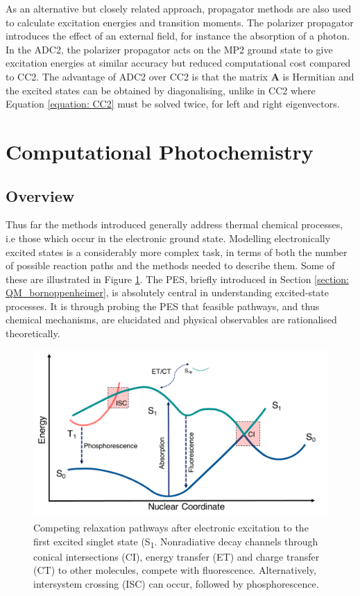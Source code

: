 As an alternative but closely related approach, propagator methods are also used to calculate excitation energies and transition moments. The polarizer propagator introduces the effect of an external field, for instance the absorption of a photon. In the \ac{ADC2}, the polarizer propagator acts on the \ac{MP2} ground state to give excitation energies at similar accuracy but reduced computational cost compared to \ac{CC}2.\cite{Trofimov1995,Trofimov1997} The advantage of \ac{ADC2} over CC2 is that the matrix $\bm{A}$ is Hermitian and the excited states can be obtained by diagonalising, unlike in CC2 where Equation \ref{equation: CC2} must be solved twice, for left and right eigenvectors.

\section{Computational Photochemistry}\label{section: Photo}
\subsection{Overview}\label{section: photo_overview}
Thus far the methods introduced generally address thermal chemical processes, i.e those which occur in the electronic ground state. Modelling electronically excited states is a considerably more complex task, in terms of both the number of possible reaction paths and the methods needed to describe them. Some of these are illustrated in Figure \ref{figure: Jablonski}. The \acf{PES}, briefly introduced in Section \ref{section: QM_bornoppenheimer}, is absolutely central in understanding excited-state processes. It is through probing the \ac{PES} that feasible pathways, and thus chemical mechanisms, are elucidated and physical observables are rationalised theoretically.

\begin{figure}[t]
\centering
  \includegraphics[width=0.8\linewidth]{2Theory/Jablonski.pdf}
  \caption[Relaxation pathways post electronic excitation.]{Competing relaxation pathways after electronic excitation to the first excited singlet state (S\textsubscript{1}. Nonradiative decay channels through conical intersections (CI), energy transfer (ET) and charge transfer (CT) to other molecules, compete with fluorescence. Alternatively, intersystem crossing (ISC) can occur, followed by phosphorescence.}
  \label{figure: Jablonski}
\end{figure}

